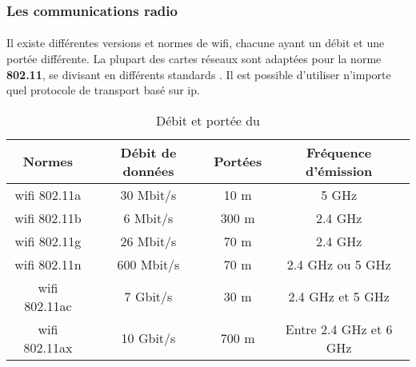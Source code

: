 \subsubsection{Les communications radio}
\label{sec:communicationRadio}

\paragraph{}
\label{sec:wifi}

Il existe différentes versions et normes de \gls{wifi}, chacune ayant un débit et une portée différente.
La plupart des cartes réseaux sont adaptées pour la norme \textbf{802.11}, se divisant en différents standards
\cite{wifi}. Il est possible d’utiliser n’importe quel protocole de transport basé sur \gls{ip}.\newline

\begin{table}[H]
    \centering
    \begin{tabular}{|c|c|c|c|}
        \hline
        \rowcolor{tableColorDark} Normes & Débit de données & Portées & Fréquence d'émission   \\
        \hline

        \gls{wifi} 802.11a               & 30 Mbit/s        & 10 m    & 5 GHz                  \\\hline
        \gls{wifi} 802.11b               & 6 Mbit/s         & 300 m   & 2.4 GHz                \\\hline
        \gls{wifi} 802.11g               & 26 Mbit/s        & 70 m    & 2.4 GHz                \\\hline
        \gls{wifi} 802.11n               & 600 Mbit/s       & 70 m    & 2.4 GHz ou 5 GHz       \\\hline
        \gls{wifi} 802.11ac              & 7 Gbit/s         & 30 m    & 2.4 GHz et 5 GHz       \\\hline
        \gls{wifi} 802.11ax              & 10 Gbit/s        & 700 m   & Entre 2.4 GHz et 6 GHz \\\hline
    \end{tabular}
    \label{tab:debitPorteeWifi}
    \caption{Débit et portée du }
    \nocite{debitPortee}
\end{table}

\paragraph{}
\label{sec:wimax}


